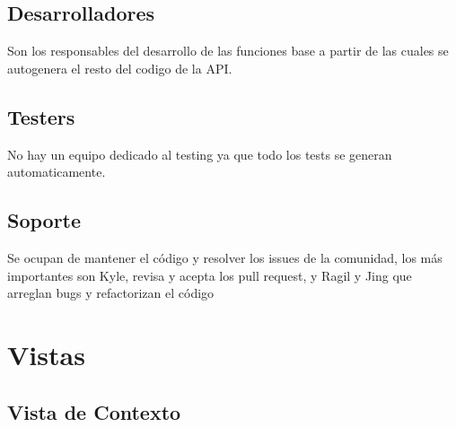 \documentclass{article}
\begin{document}
  \subsection*{Desarrolladores}
  Son los responsables del desarrollo de las funciones base a partir de las cuales se autogenera el resto del codigo de la API.
  \subsection*{Testers}
  No hay un equipo dedicado al testing ya que todo los tests se generan automaticamente.
  \subsection*{Soporte}
  Se ocupan de mantener el código y resolver los issues de la comunidad, los más importantes son Kyle, revisa y acepta los pull request, y Ragil y Jing que  arreglan bugs y refactorizan el código
\section{Vistas}

\subsection{Vista de Contexto}

  \begin{center}

    
    
  \end{center}
\end{document}
